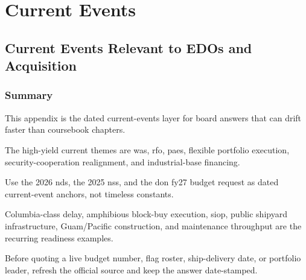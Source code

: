 \documentclass[../main.tex]{subfiles}
\begin{document}
\chapter{Current Events}\label{app:current-events-snapshot}
\section{Current Events Relevant to EDOs and Acquisition}

\subsection{Summary}
\begin{description}[style=nextline,labelsep=0.5em,font=\bfseries]
  \item[Purpose.] This appendix is the dated current-events layer for board answers that can drift faster than coursebook chapters.
  \item[Acquisition reform.] The high-yield current themes are \ac{was}, \ac{rfo}, \acp{pae}, flexible portfolio execution, security-cooperation realignment, and industrial-base financing.
  \item[Strategy and budget.] Use the 2026 \ac{nds}, the 2025 \ac{nss}, and the \ac{don} \ac{fy}27 budget request as dated current-event anchors, not timeless constants.
  \item[Shipbuilding and sustainment.] Columbia-class delay, amphibious block-buy execution, \ac{siop}, public shipyard infrastructure, Guam/Pacific construction, and maintenance throughput are the recurring readiness examples.
  \item[Refresh rule.] Before quoting a live budget number, flag roster, ship-delivery date, or portfolio leader, refresh the official source and keep the answer date-stamped.
\end{description}
\end{document}
